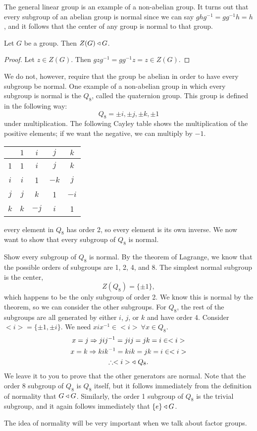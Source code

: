 The general linear group is an example of a non-abelian group. It turns out that every subgroup of an abelian group is normal since we can say $ghg^{-1}=gg^{-1}h=h$, and it follows that the center of any group is normal to that group.
\begin{theorem}{}
	Let $G$ be a group. Then $Z(G)\triangleleft G$.
\end{theorem}
\begin{proof}
	Let $z\in Z(G)$. Then $gzg^{-1}=gg^{-1}z=z\in Z(G)$.
\end{proof}

We do not, however, require that the group be abelian in order to have every subgroup be normal. One example of a non-abelian group in which every subgroup is normal is the $Q_{8}$, called the quaternion group. This group is defined in the following way:
\[
	Q_{8}={\pm i, \pm j,\pm k, \pm 1}
\]
under multiplication. The following Cayley table shows the multiplication of the positive elements; if we want the negative, we can multiply by $-1$.
\begin{center}
	\begin{tabular}{c | c c c c}
		    & $1$ & $i$  & $j$  & $k$  \\
		\hline
		1   & 1   & $i$  & $j$  & $k$  \\
		$i$ & $i$ & 1    & $-k$ & $j$  \\
		$j$ & $j$ & $k$  & 1    & $-i$ \\
		$k$ & $k$ & $-j$ & $i$  & 1    \\
	\end{tabular}
\end{center}
every element in $Q_{8}$ has order 2, so every element is its own inverse. We now want to show that every subgroup of $Q_{8}$ is normal.

\begin{example}{Show every subgroup of $Q_{8}$ is normal.}
	By the theorem of Lagrange, we know that the possible orders of subgroups are 1, 2, 4, and 8. The simplest normal subgroup is the center,
	\[
		Z(Q_{8})=\{\pm 1\},
	\]
	which happens to be the only subgroup of order 2.
	We know this is normal by the theorem, so we can consider the other subgroups. For $Q_{8}$, the rest of the subgroups are all generated by either $i$, $j$, or $k$ and have order 4. Consider $<i>=\{\pm 1, \pm i\}$. We need $xix^{-1}\in<i>\ \forall x\in Q_{8}$.
	\begin{gather*}
		x=j\Rightarrow jij^{-1}=jij=jk=i\in<i>\\
		x=k\Rightarrow kik^{-1}=kik=jk=i\in<i>\\
		\therefore <i>\triangleleft\ Q_{8}.
	\end{gather*}
	We leave it to you to prove that the other generators are normal. Note that the order 8 subgroup of $Q_{8}$ is $Q_{8}$ itself, but it follows immediately from the definition of normality that $G\triangleleft G$. Similarly, the order 1 subgroup of $Q_{8}$ is the trivial subgroup, and it again follows immediately that $\{e\}\triangleleft G$.
\end{example}
The idea of normality will be very important when we talk about factor groups.

